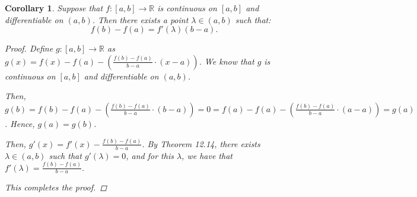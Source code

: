 \documentclass[11pt]{article}
\newcommand{\bbR}{\mathbb{R}}
\renewcommand{\_}[1]{\underline{ #1 }}
\newtheorem{corollary}[theorem]{Corollary}
\theoremstyle{definition}
\numberwithin{equation}{subsection}
\begin{document}
\begin{corollary}
	\label{cor:mit}
	Suppose that $f\colon [a, b] \to \bbR$ is continuous on $[a, b]$ and differentiable on $(a, b)$. Then there exists a point $\lambda \in (a, b)$ such that:
	\[
		f(b) - f(a) = f'(\lambda) (b - a).
	\]
    
\begin{proof}
Define $g: [a,b] \rightarrow \bbR$ as $g(x)=f(x)-f(a)-(\frac{f(b)-f(a)}{b-a}\cdot (x-a))$. We know that $g$ is continuous on $[a,b]$ and differentiable on $(a,b)$.

Then, $g(b) = f(b)-f(a)-(\frac{f(b)-f(a)}{b-a}\cdot (b-a))=0=f(a)-f(a)-(\frac{f(b)-f(a)}{b-a}\cdot (a-a))=g(a)$. Hence, $g(a)=g(b)$.

Then, $g'(x)=f'(x)-\frac{f(b)-f(a)}{b-a}$. By Theorem 12.14, there exists $\lambda\in (a,b)$ such that $g'(\lambda) = 0$, and for this $\lambda$, we have that $f'(\lambda)=\frac{f(b)-f(a)}{b-a}$. 

This completes the proof.

\renewcommand\qedsymbol{QED}
\end{proof}


\end{corollary}
\end{document}
